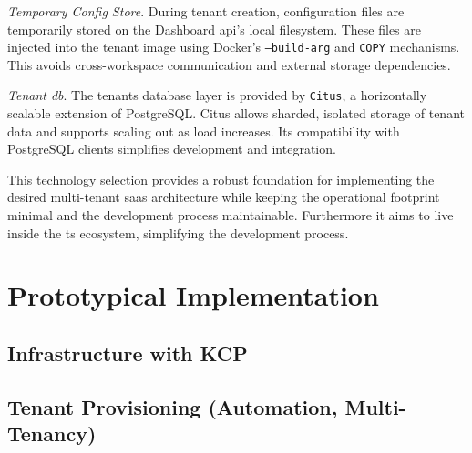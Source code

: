 \documentclass[11pt, a4paper, oneside, listof=totoc]{scrartcl}
\begin{document}
\begin{enumerate}[label={[\arabic*]:},
                ref=Challenge~\arabic*,
                leftmargin=*,
                itemsep=0.6\baselineskip]
                \item\label{chal:tempConfigStore}
                    \textit{Temporary Config Store}.
                    During tenant creation, configuration files are temporarily stored on the
                    Dashboard \gls{api}'s local filesystem.
                    These files are injected into the tenant image using Docker's
                    \texttt{--build-arg} and \texttt{COPY} mechanisms.
                    This avoids cross-workspace communication and external storage dependencies.

                \item\label{chal:tenantDB2}
                    \textit{Tenant \gls{db}}.
                    The tenants database layer is provided by \texttt{Citus}, a horizontally
                    scalable extension of PostgreSQL.\@
                    Citus allows sharded, isolated storage of tenant data and supports scaling out
                    as load increases.
                    Its compatibility with PostgreSQL clients simplifies development and
                    integration.

            \end{enumerate}

            This technology selection provides a robust foundation for implementing the desired
            multi-tenant \gls{saas} architecture while keeping the operational footprint minimal and
            the development process maintainable.
            Furthermore it aims to live inside the \gls{ts} ecosystem, simplifying the development
            process.
            \cleardoublepage

    \section{Prototypical Implementation}\label{sec:prototype}

        \subsection{Infrastructure with KCP}\label{subsec:infrastructure}

        \subsection[Tenant Provisioning]{Tenant Provisioning (Automation, Multi-Tenancy)}\label{subsec:tenantProvisioning}
\end{document}
